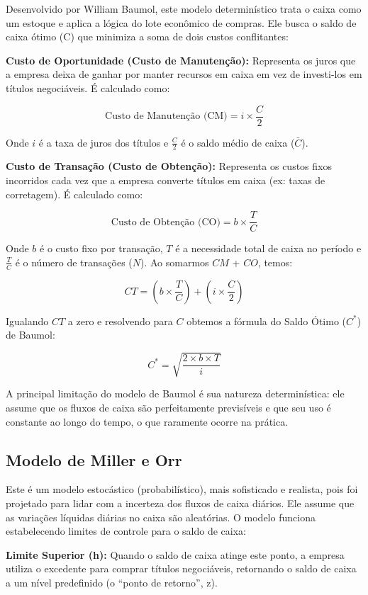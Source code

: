 \documentclass[
  a4paper,
]{book}
\begin{document}
Desenvolvido por William Baumol, este modelo determinístico trata o
caixa como um estoque e aplica a lógica do lote econômico de compras.
Ele busca o saldo de caixa ótimo (C) que minimiza a soma de dois custos
conflitantes:

\textbf{Custo de Oportunidade (Custo de Manutenção):} Representa os
juros que a empresa deixa de ganhar por manter recursos em caixa em vez
de investi-los em títulos negociáveis. É calculado como:

\[\text{Custo de Manutenção (CM)} = i \times \frac{C}{2}\]

Onde \(i\) é a taxa de juros dos títulos e \(\frac{C}{2}\) é o saldo
médio de caixa (\(\bar{C}\)).

\textbf{Custo de Transação (Custo de Obtenção):} Representa os custos
fixos incorridos cada vez que a empresa converte títulos em caixa (ex:
taxas de corretagem). É calculado como:

\[\text{Custo de Obtenção (CO)} = b \times \frac{T}{C}\]

Onde \(b\) é o custo fixo por transação, \(T\) é a necessidade total de
caixa no período e \(\frac{T}{C}\) é o número de transações (\(N\)). Ao
somarmos \(CM\) + \(CO\), temos:

\[CT = \left( b \times \frac{T}{C} \right) + \left( i \times \frac{C}{2} \right)\]

Igualando \(CT\) a zero e resolvendo para \(C\) obtemos a fórmula do
Saldo Ótimo (\(C^*\)) de Baumol:

\[C^* = \sqrt{\frac{2 \times b \times T}{i}}\]

A principal limitação do modelo de Baumol é sua natureza determinística:
ele assume que os fluxos de caixa são perfeitamente previsíveis e que
seu uso é constante ao longo do tempo, o que raramente ocorre na
prática.

\subsection{Modelo de Miller e Orr}\label{modelo-de-miller-e-orr}

Este é um modelo estocástico (probabilístico), mais sofisticado e
realista, pois foi projetado para lidar com a incerteza dos fluxos de
caixa diários. Ele assume que as variações líquidas diárias no caixa são
aleatórias. O modelo funciona estabelecendo limites de controle para o
saldo de caixa:

\textbf{Limite Superior (h):} Quando o saldo de caixa atinge este ponto,
a empresa utiliza o excedente para comprar títulos negociáveis,
retornando o saldo de caixa a um nível predefinido (o ``ponto de
retorno'', z).
\end{document}
